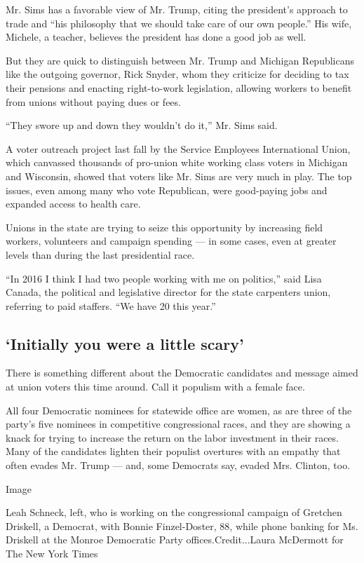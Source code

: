 Mr. Sims has a favorable view of Mr. Trump, citing the president's
approach to trade and ``his philosophy that we should take care of our
own people.'' His wife, Michele, a teacher, believes the president has
done a good job as well.

But they are quick to distinguish between Mr. Trump and Michigan
Republicans like the outgoing governor, Rick Snyder, whom they criticize
for deciding to tax their pensions and enacting right-to-work
legislation, allowing workers to benefit from unions without paying dues
or fees.

``They swore up and down they wouldn't do it,'' Mr. Sims said.

A voter outreach project last fall by the Service Employees
International Union, which canvassed thousands of pro-union white
working class voters in Michigan and Wisconsin, showed that voters like
Mr. Sims are very much in play. The top issues, even among many who vote
Republican, were good-paying jobs and expanded access to health care.

Unions in the state are trying to seize this opportunity by increasing
field workers, volunteers and campaign spending --- in some cases, even
at greater levels than during the last presidential race.

``In 2016 I think I had two people working with me on politics,'' said
Lisa Canada, the political and legislative director for the state
carpenters union, referring to paid staffers. ``We have 20 this year.''

\hypertarget{initially-you-were-a-little-scary}{%
\subsection{`Initially you were a little
scary'}\label{initially-you-were-a-little-scary}}

There is something different about the Democratic candidates and message
aimed at union voters this time around. Call it populism with a female
face.

All four Democratic nominees for statewide office are women, as are
three of the party's five nominees in competitive congressional races,
and they are showing a knack for trying to increase the return on the
labor investment in their races. Many of the candidates lighten their
populist overtures with an empathy that often evades Mr. Trump --- and,
some Democrats say, evaded Mrs. Clinton, too.

Image

Leah Schneck, left, who is working on the congressional campaign of
Gretchen Driskell, a Democrat, with Bonnie Finzel-Doster, 88, while
phone banking for Ms. Driskell at the Monroe Democratic Party
offices.Credit...Laura McDermott for The New York Times

